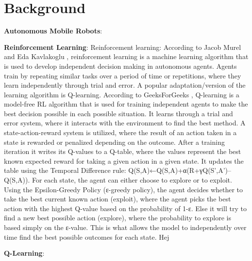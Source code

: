 \section{Background}

\textbf{Autonomous Mobile Robots}:


\textbf{Reinforcement Learning}:
Reinforcement learning: According to Jacob Murel and Eda Kavlakoglu \cite{JacobMurel1RL}, reinforcement learning is a machine learning
algorithm that is used to develop independent decision making in autonomous agents.
Agents train by repeating similar tasks over a period of time or repetitions, where they
learn independently through trial and error. A popular adaptation/version of the learning
algorithm is Q-learning. According to GeeksForGeeks \cite{GeeksForGeeks1RL}, Q-learning is a model-free RL
algorithm that is used for training independent agents to make the best decision
possible in each possible situation. It learns through a trial and error system, where it
interacts with the environment to find the best method. A state-action-reward system is
utilized, where the result of an action taken in a state is rewarded or penalized
depending on the outcome. After a training iteration it writes its Q-values to a Q-table,
where the values represent the best known expected reward for taking a given action in
a given state. It updates the table using the Temporal Difference rule:
Q(S,A)←Q(S,A)+α(R+γQ(S’,A’)–Q(S,A)). For each state, the agent can either choose to
explore or to exploit. Using the Epsilon-Greedy Policy (ε-greedy policy), the agent
decides whether to take the best current known action (exploit), where the agent picks
the best action with the highest Q-value based on the probability of 1-ε. Else it will try to
find a new best possible action (explore), where the probability to explore is based
simply on the ε-value. This is what allows the model to independently over time find the
best possible outcomes for each state. Hej


\textbf{Q-Learning}: